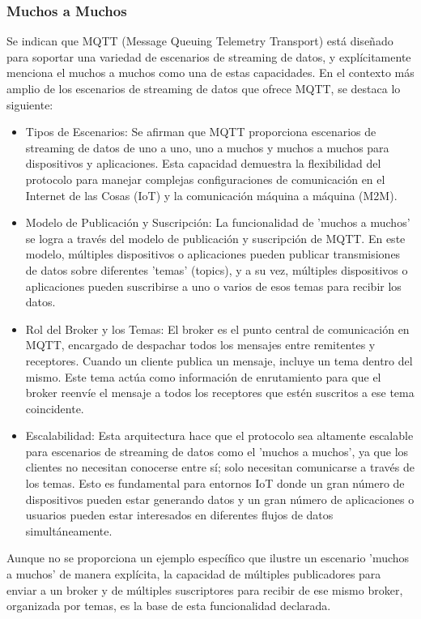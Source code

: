 \documentclass{report}
\begin{document}
\subsubsection{Muchos a Muchos}
Se  indican que MQTT (Message Queuing Telemetry Transport) está diseñado para soportar una variedad de escenarios de 
streaming de datos, y explícitamente menciona el muchos a muchos como una de estas capacidades.
En el contexto más amplio de los escenarios de streaming de datos que ofrece MQTT, se destaca lo siguiente:
\begin{itemize}
    \item Tipos de Escenarios: Se  afirman que MQTT proporciona escenarios de streaming de datos de uno a uno, uno a muchos y 
    muchos a muchos para dispositivos y aplicaciones. Esta capacidad demuestra la flexibilidad del protocolo para manejar complejas 
    configuraciones de comunicación en el Internet de las Cosas (IoT) y la comunicación máquina a máquina (M2M).
    \item Modelo de Publicación y Suscripción: La funcionalidad de 'muchos a muchos' se logra a través del modelo de publicación y 
    suscripción de MQTT. En este modelo, múltiples dispositivos o aplicaciones pueden publicar transmisiones de datos sobre diferentes 
    'temas' (topics), y a su vez, múltiples dispositivos o aplicaciones pueden suscribirse a uno o varios de esos temas 
    para recibir los datos.
    \item Rol del Broker y los Temas: El broker es el punto central de comunicación en MQTT, encargado de despachar todos 
    los mensajes entre remitentes y receptores. Cuando un cliente publica un mensaje, incluye un tema dentro del mismo. 
    Este tema actúa como información de enrutamiento para que el broker reenvíe el mensaje a todos los receptores que estén 
    suscritos a ese tema coincidente.
    \item Escalabilidad: Esta arquitectura hace que el protocolo sea altamente escalable para escenarios de streaming de datos 
    como el 'muchos a muchos', ya que los clientes no necesitan conocerse entre sí; solo necesitan comunicarse a través de los 
    temas. Esto es fundamental para entornos IoT donde un gran número de dispositivos pueden estar generando datos y un gran 
    número de aplicaciones o usuarios pueden estar interesados en diferentes flujos de datos simultáneamente.
\end{itemize}
Aunque no se proporciona un ejemplo específico que ilustre un escenario 'muchos a muchos' de manera explícita, 
la capacidad de múltiples publicadores para enviar a un broker y de múltiples suscriptores para recibir de ese mismo broker, 
organizada por temas, es la base de esta funcionalidad declarada.
\end{document}
